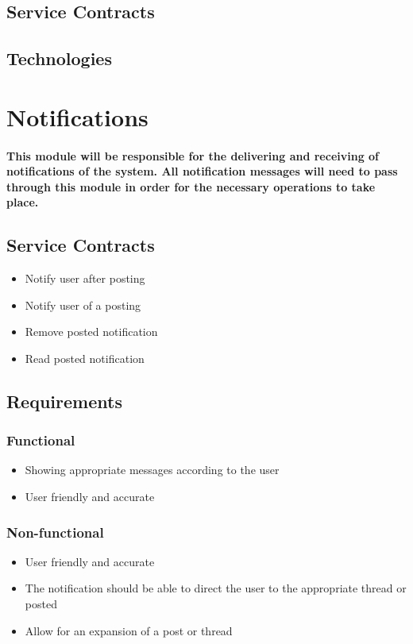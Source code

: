 \documentclass[12pt]{article}
\begin{document}
\subsection{Service Contracts}
\paragraph{}
	 	 
\subsection{Technologies}
\paragraph{}
\section{Notifications}
\paragraph{This module will be responsible for the delivering and receiving of notifications of the system. All notification messages will need to pass through this module in order for the necessary operations to take place.}
\subsection{Service Contracts}
\begin{itemize}
\item Notify user after posting
\item Notify user of a posting
\item Remove posted notification 
\item Read posted notification
\end{itemize}
\subsection{Requirements}
\subsubsection{Functional}
\begin{itemize}
\item Showing appropriate messages according to the user
\item User friendly and accurate
\end{itemize}
\subsubsection{Non-functional}
\begin{itemize}
\item User friendly and accurate
\item The notification should be able to direct the user to the appropriate thread or posted
\item Allow for an expansion of a post or thread 
\end{itemize}
\end{document}
